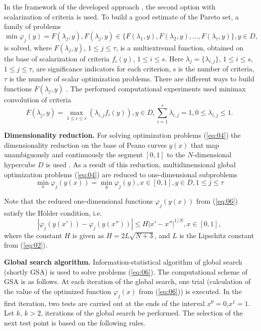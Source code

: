 \documentclass[runningheads]{llncs}
\begin{document}
In the framework of the developed approach \cite{Konnov2025}, the second option with scalarization of criteria is used. To build a good estimate of the Pareto set, a family of problems
\begin{equation}
\label{eq:04}
\min {\varphi_j (y)}=F(\lambda_j,y),F(\lambda_j,y) \in \{F(\lambda_1,y),F(\lambda_2,y),\dots,F(\lambda_\tau,y)\},y\in D,
\end{equation}
is solved,  where $F(\lambda_j,y)$, $1 \leq j \leq \tau$, is a multiextremal function, obtained on the base of scalarization of criteria $f_i(y)$, $1 \leq i \leq s$. Here $\lambda_j=\{\lambda_{i,j}\}$, $1 \leq i \leq s$, $1 \leq j \leq \tau$, are significance indicators for each criterion, s is the number of criteria, $\tau$ is the number of scalar optimization problems. There are different ways to build functions $F(\lambda_j,y)$ \cite{Miettinen1999,Konnov2025,Marler2004}. The performed computational experiments used minimax convolution of criteria
\begin{equation}
\label{eq:05}
F(\lambda_j, y) = \max_{1 \leq i \leq s} \left(\lambda_{i,j} f_i (y)\right), y \in D, \sum_{i=1}^s {\lambda_{i,j}} = 1, 0 \leq \lambda_{i,j} \leq 1.
\end{equation}

\textbf{Dimensionality reduction.} For solving optimization problems (\ref{eq:04}) the dimensionality reduction on the base of Peano curves $y(x)$ that map unambiguously and continuously the segment $[0,1]$ to the $N$-dimensional hypercube $D$ is used \cite{Konnov2025,Gergel2019_2,GergelKozinov2020}. As a result of this reduction, multidimensional global optimization problems (\ref{eq:04}) are reduced to one-dimensional subproblems
\begin{equation}
\label{eq:06}
\min_x {\varphi_j(y(x))} = \min_y {\varphi_j(y)}, x \in [0,1], y \in D, 1 \leq j \leq \tau
\end{equation}

Note that the reduced one-dimensional functions $\varphi_j (y(x))$ from (\ref{eq:06}) satisfy the H{\" o}lder condition, i.e.
\begin{equation}
\label{eq:07}
|\varphi_j(y(x')) - \varphi_j(y(x''))| \leq H |x' - x''|^{1/N} , x \in [0,1],
\end{equation}
where the constant $H$ is given as $H=2L\sqrt{N+3}$, and $L$ is the Lipschitz constant from (\ref{eq:02}).

\textbf{Global search algorithm.} Information-statistical algorithm of global search (shortly GSA) \cite{Konnov2025,Gergel2019_2,Gergel2018,GergelKozinov2020,Strongin2000,Sergeyev2013} is used to solve problems (\ref{eq:06}). The computational scheme of GSA is as follows. At each iteration of the global search, one trial (calculation of the value of the optimized function $\varphi_j (x)$ from (\ref{eq:06})) is executed. In the first iteration, two tests are carried out at the ends of the interval $x^0=0$,$x^1=1$. Let $k$, $k>2$, iterations of the global search be performed. The selection of the next test point is based on the following rules.
\end{document}
